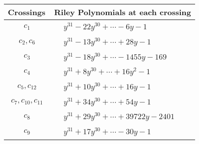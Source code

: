 \documentclass[1p]{elsarticle_modified}
\theoremstyle{definition}
\begin{document}
\begin{tabular}{m{50pt}|m{274pt}}
Crossings & \hspace{64pt}Riley Polynomials at each crossing \\
\hline $$\begin{aligned}c_{1}\end{aligned}$$&$\begin{aligned}
&y^{31}-22 y^{30}+\cdots-6 y-1
\end{aligned}$\\
\hline $$\begin{aligned}c_{2},c_{6}\end{aligned}$$&$\begin{aligned}
&y^{31}-13 y^{30}+\cdots+28 y-1
\end{aligned}$\\
\hline $$\begin{aligned}c_{3}\end{aligned}$$&$\begin{aligned}
&y^{31}-18 y^{30}+\cdots-1455 y-169
\end{aligned}$\\
\hline $$\begin{aligned}c_{4}\end{aligned}$$&$\begin{aligned}
&y^{31}+8 y^{30}+\cdots+16 y^2-1
\end{aligned}$\\
\hline $$\begin{aligned}c_{5},c_{12}\end{aligned}$$&$\begin{aligned}
&y^{31}+10 y^{30}+\cdots+16 y-1
\end{aligned}$\\
\hline $$\begin{aligned}c_{7},c_{10},c_{11}\end{aligned}$$&$\begin{aligned}
&y^{31}+34 y^{30}+\cdots+54 y-1
\end{aligned}$\\
\hline $$\begin{aligned}c_{8}\end{aligned}$$&$\begin{aligned}
&y^{31}+29 y^{30}+\cdots+39722 y-2401
\end{aligned}$\\
\hline $$\begin{aligned}c_{9}\end{aligned}$$&$\begin{aligned}
&y^{31}+17 y^{30}+\cdots-30 y-1
\end{aligned}$\\
\hline
\end{tabular}\\~\\
\end{document}
